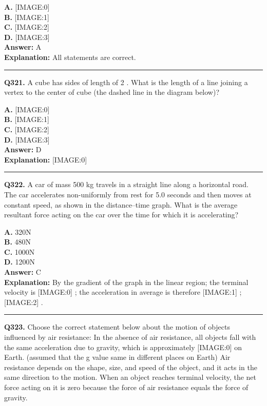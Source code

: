 \documentclass[12pt]{article}
\begin{document}
\textbf{A.} [IMAGE:0] \\
\textbf{B.} [IMAGE:1] \\
\textbf{C.} [IMAGE:2] \\
\textbf{D.} [IMAGE:3] \\

\textbf{Answer:} A \\
\textbf{Explanation:} All statements are correct.

\hrule
\vspace{1em}


\noindent
\textbf{Q321.} A cube has sides of length of 2
. What is the length of a line joining a vertex to the center of cube (the dashed line in the diagram below)?



\textbf{A.} [IMAGE:0] \\
\textbf{B.} [IMAGE:1] \\
\textbf{C.} [IMAGE:2] \\
\textbf{D.} [IMAGE:3] \\

\textbf{Answer:} D \\
\textbf{Explanation:} [IMAGE:0]

\hrule
\vspace{1em}


\noindent
\textbf{Q322.} A car of mass 500 kg travels in a straight line along a horizontal road.
The car accelerates non-uniformly from rest for 5.0 seconds and then moves at constant speed, as shown in the distance–time graph.
What is the average resultant force acting on the car over the time for which it is accelerating?



\textbf{A.} 320N \\
\textbf{B.} 480N \\
\textbf{C.} 1000N \\
\textbf{D.} 1200N \\

\textbf{Answer:} C \\
\textbf{Explanation:} By the gradient of the graph in the linear region; the terminal velocity is
[IMAGE:0]
; the acceleration in average is therefore
[IMAGE:1]
;
[IMAGE:2]
.

\hrule
\vspace{1em}


\noindent
\textbf{Q323.} Choose the correct statement below about the motion of objects influenced by air resistance:
In the absence of air resistance, all objects fall with the same acceleration due to gravity, which is approximately
[IMAGE:0]
on Earth. (assumed that the g value same in different places on Earth)
Air resistance depends on the shape, size, and speed of the object, and it acts in the same direction to the motion.
When an object reaches terminal velocity, the net force acting on it is zero because the force of air resistance equals the force of gravity.
\end{document}
